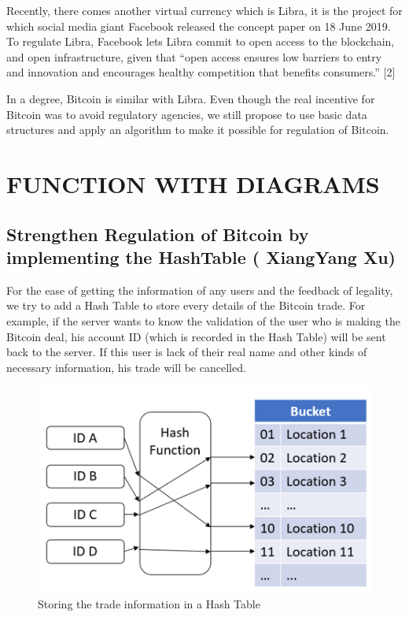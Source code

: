 \documentclass[conference]{IEEEtran}
\begin{document}
Recently, there comes another virtual currency which is Libra, it is the project for which social media giant Facebook released the concept paper on 18 June 2019. To regulate Libra, Facebook lets Libra commit to open access to the blockchain, and open infrastructure, given that “open access ensures low barriers to entry and innovation and encourages healthy competition that benefits consumers.” [2]

In a degree, Bitcoin is similar with Libra. Even though the real incentive for Bitcoin was to avoid regulatory agencies, we still propose to use basic data structures and apply an algorithm to make it possible for regulation of Bitcoin.

\section{FUNCTION WITH DIAGRAMS}
\subsection{Strengthen Regulation of Bitcoin by implementing the HashTable ( XiangYang Xu)}

For the ease of getting the information of any users and the feedback of legality, we try to add a Hash Table to store every details of the Bitcoin trade. For example, if the server wants to know the validation of the user who is making the Bitcoin deal, his account ID (which is recorded in the Hash Table) will be sent back to the server. If this user is lack of their real name and other kinds of necessary information, his trade will be cancelled.

\begin{figure}[ht]
	\centering
	\includegraphics[scale=0.4]{fig3.png}
	\caption{Storing the trade information in a Hash Table}
	\label{fig:label}
\end{figure}
\end{document}
